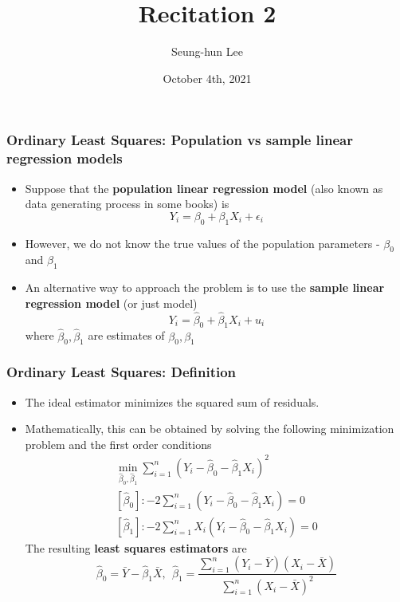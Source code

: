\documentclass[aspectratio=169]{beamer}
\title[Recitation 2]{Recitation 2} %
\author[Seung-hun Lee]{Seung-hun Lee}
\institute[Columbia University]{Columbia University}
\date[October 4th, 2021]{October 4th, 2021}
\begin{document}
\begin{frame}
\titlepage
\end{frame}



\begin{frame}
\frametitle{Ordinary Least Squares: Population vs sample linear regression models}
\begin{itemize}
\item Suppose that the \textbf{population linear regression model} (also known as data generating process in some books) is
\[
Y_i = \beta_0 + \beta_1X_i + \epsilon_i
\]
\item However, we do not know the true values of the population parameters - $\beta_0$ and $\beta_1$
\item An alternative way to approach the problem is to use the \textbf{sample linear regression model} (or just model)
\[
Y_i = \hat{\beta}_0 +\hat{\beta}_1X_i +u_i
\]
where $\hat{\beta}_0, \hat{\beta}_1$ are estimates of ${\beta}_0, {\beta}_1$

\end{itemize}
\end{frame}

\begin{frame}
\frametitle{Ordinary Least Squares: Definition}
\begin{itemize}
\item The ideal estimator minimizes the squared sum of residuals. 
\item Mathematically, this can be obtained by solving the following minimization problem and the first order conditions
\footnotesize{\begin{gather*}
\min_{\hat{\beta}_0, \hat{\beta}_1} \sum_{i=1}^n (Y_i-\hat{\beta}_0 - \hat{\beta}_1X_i)^2\\
[\hat{\beta}_0]: -2\sum_{i=1}^n(Y_i-\hat{\beta}_0-\hat{\beta}_1X_i)=0\\
[\hat{\beta}_1]: -2\sum_{i=1}^nX_i(Y_i-\hat{\beta}_0-\hat{\beta}_1X_i)=0 
\end{gather*}}\normalsize
The resulting \textbf{least squares estimators} are
\[
\hat{\beta}_0 = \bar{Y}-\hat{\beta}_1\bar{X}, \ \ \hat{\beta}_1=\frac{\sum_{i=1}^n(Y_i-\bar{Y})(X_i-\bar{X})}{\sum_{i=1}^n(X_i-\bar{X})^2}
\]
\end{itemize}
\end{frame}
\end{document}
